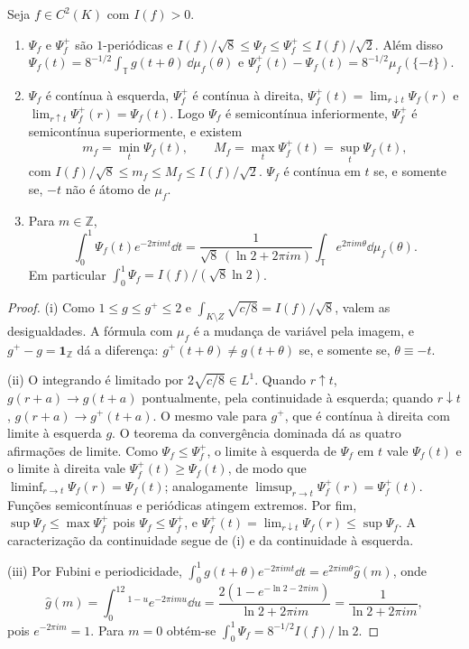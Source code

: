 \begin{lemma}\label{map:artigo_2:12.5}
\label{artigo_2:lem:phase-function-properties}
Seja $f\in C^2(K)$ com $I(f)>0$.
\begin{enumerate}[label=(\roman*)]
\item $\Psi_f$ e $\Psi_f^+$ são $1$-periódicas e
 $I(f)/\sqrt8\le\Psi_f\le\Psi_f^+\le I(f)/\sqrt2$. Além disso
 $\Psi_f(t)=8^{-1/2}\int_{\mathbb T}g(t+\theta)\,\dd\mu_f(\theta)$ e
 $\Psi_f^+(t)-\Psi_f(t)=8^{-1/2}\mu_f(\{-t\})$.
\item $\Psi_f$ é contínua à esquerda, $\Psi_f^+$ é contínua à direita,
 $\Psi_f^+(t)=\lim_{r\downarrow t}\Psi_f(r)$ e $\lim_{r\uparrow t}\Psi_f^+(r)=\Psi_f(t)$.
 Logo $\Psi_f$ é semicontínua inferiormente, $\Psi_f^+$ é semicontínua
 superiormente, e existem
 \[
  m_f=\min_{t}\Psi_f(t),\qquad M_f=\max_t\Psi_f^+(t)=\sup_t\Psi_f(t),
 \]
 com $I(f)/\sqrt8\le m_f\le M_f\le I(f)/\sqrt2$.
 $\Psi_f$ é contínua em $t$ se, e somente se, $-t$ não é átomo de $\mu_f$.
\item Para $m\in\mathbb Z$,
 \[
  \int_0^1\Psi_f(t)e^{-2\pi imt}\dd t
  =\frac{1}{\sqrt8\,(\ln2+2\pi im)}\int_{\mathbb T}e^{2\pi im\theta}\dd\mu_f(\theta).
 \]
 Em particular $\int_0^1\Psi_f=I(f)/(\sqrt8\ln2)$.
\end{enumerate}
\end{lemma}

\begin{proof}
(i) Como $1\le g\le g^+\le2$ e $\int_{K\setminus Z}\sqrt{c/8}=I(f)/\sqrt8$, valem as
desigualdades. A fórmula com $\mu_f$ é a mudança de variável pela imagem, e
$g^+-g=\mathbf 1_{\mathbb Z}$ dá a diferença: $g^+(t+\theta)\ne g(t+\theta)$
se, e somente se, $\theta\equiv-t$.

(ii) O integrando é limitado por $2\sqrt{c/8}\in L^1$. Quando $r\uparrow t$,
$g(r+a)\to g(t+a)$ pontualmente, pela continuidade à esquerda; quando
$r\downarrow t$, $g(r+a)\to g^+(t+a)$. O mesmo vale para $g^+$, que é
contínua à direita com limite à esquerda $g$. O teorema da convergência
dominada dá as quatro afirmações de limite. Como $\Psi_f\le\Psi_f^+$, o limite à
esquerda de $\Psi_f$ em $t$ vale $\Psi_f(t)$ e o limite à direita vale
$\Psi_f^+(t)\ge\Psi_f(t)$, de modo que $\liminf_{r\to t}\Psi_f(r)=\Psi_f(t)$;
analogamente $\limsup_{r\to t}\Psi_f^+(r)=\Psi_f^+(t)$. Funções
semicontínuas e periódicas atingem extremos. Por fim, $\sup\Psi_f\le\max\Psi_f^+$
pois $\Psi_f\le\Psi_f^+$, e $\Psi_f^+(t)=\lim_{r\downarrow t}\Psi_f(r)\le\sup\Psi_f$.
A caracterização da continuidade segue de (i) e da continuidade à esquerda.

(iii) Por Fubini e periodicidade,
$\int_0^1g(t+\theta)e^{-2\pi imt}\dd t=e^{2\pi im\theta}\hat g(m)$, onde
\[
 \hat g(m)=\int_0^12^{1-u}e^{-2\pi imu}\dd u
 =\frac{2(1-e^{-\ln2-2\pi im})}{\ln2+2\pi im}=\frac1{\ln2+2\pi im},
\]
pois $e^{-2\pi im}=1$. Para $m=0$ obtém-se $\int_0^1\Psi_f=8^{-1/2}I(f)/\ln2$.
\end{proof}

